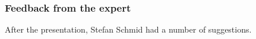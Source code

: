 \subsubsection{Feedback from the expert}
After the presentation, Stefan Schmid had a number of suggestions. %
\begin{comment}
\section{Initial ideas for a GUI} \label{sec:GUI}
The final product has to have a user-friendly and intuitve design. The initial
thoughts for this, included a simple search bar, where the target twitter name
is inserted. This leads to a page that shows various information about the
account:
\subsection*{Basic information}
This part shows basic information about the account, such as name, username,
amount of followers and the amount of pages it follows.
\subsection*{Political spectrum}
This part shows a visual presentation of the user's political stance in the form
of two sliders. The first slider goes from 0 to 10, where 0 is very left
oriented and 10 is very right oriented. The first slider also goes from 0 to 10,
and goes from libertarian to authoritarian.
\subsection*{Your bubble}
This part shows the political spectrum of the ones the target twitter user
follows. As these dictate what is in the target twitter user's twitter feed,
they determine the filter bubble.
 \subsection*{Suggestions to break the filter bubble}
 From the political spectrum of the filter bubble, a list of suggested twitter
 users is shown. This list includes twitter users from the opposite site of the
 political spectrum.
\end{comment}